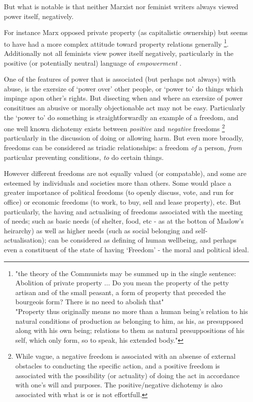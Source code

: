But what is notable is that neither Marxist nor feminist writers always viewed power itself, negatively.

For instance Marx opposed private property (as capitalistic ownership) but seems to have had a more complex attitude toward property relations generally \footnote{"the theory of the Communists may be summed up in the single sentence: Abolition of private property ... Do you mean the property of the petty artisan and of the small peasant, a form of property that preceded the bourgeois form? There is no need to abolish that"\cite{MarxGutenberg}\\"Property thus originally means no more than a human being's relation to his natural conditions of production as belonging to him, as his, as presupposed along with his own being; relations to them as natural presuppositions of his self, which only form, so to speak, his extended body."\cite{marx_capital_I}}.
Additionally not all feminists view power itself negatively, particularly in the positive (or potentially neutral) language of \textit{empowerment} \cite{doi:10.1111/j.1527-2001.1998.tb01350.x}.

One of the features of power that is associated (but perhaps not always) with abuse, is the exersize of `power over' other people, or `power to' do things which impinge apon other's rights.\cite{doi:10.1111/j.1527-2001.1998.tb01350.x}
But disecting when and where an exersize of power consititues an abusive or morally objectionable act may not be easy.
Particularly the `power to' do something is straightforwardly an example of a freedom, and one well known dichotemy exists between \textit{positive} and \textit{negative} freedoms
\footnote{While vague, a negative freedom is associated with an absense of external obstacles to conducting the specific action, and a positive freedom is associated with the possibility (or actuality) of doing the act in accordance with one's will and purposes. The positive/negative dichotemy is also associated with what is or is not effortfull.\cite{Mossel2009-MOSNA}} particularly in the discussion of doing or allowing harm.
But even more broadly, freedoms can be considered as triadic relationships: a freedom \textit{of} a person, \textit{from} particular preventing conditions, \textit{to} do certain things.\cite{Negative_and_Positive_Freedom}

However different freedoms are not equally valued (or compatable), and some are esteemed by individuals and societies more than others.
Some would place a greater importance of political freedoms (to openly discuss, vote, and run for office) or economic freedoms (to work, to buy, sell and lease property), etc.
But particularly, the having and actualising of freedoms associated with the meeting of needs; such as basic needs (of shelter, food, etc - as at the botton of Maslow's heirarchy) as well as higher needs (such as social belonging and self-actualisation); can be considered as defining of human wellbeing, and perhaps even a constituent of the state of having `Freedom' - the moral and political ideal.

